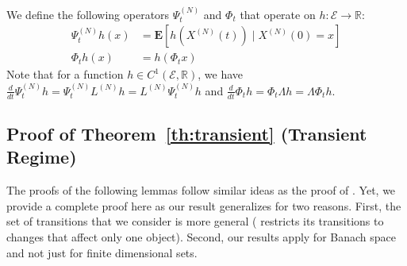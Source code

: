 \documentclass[sigconf]{acmart}
\newcommand\XN{X^{(N)}}
\newcommand\LN{L^{(N)}}
\newcommand\PsiN{\Psi^{(N)}}
\newcommand\E{\mathcal{E}}
\newcommand\R{\mathbb{R}}
\newcommand\esp[1]{\mathbf{E}\left[#1\right]}
\newcommand\dt{\frac{d}{dt}}
\begin{document}
We define the following operators $\PsiN_t$ and $\Phi_t$ that operate
on $h:\E\to\R$:
\begin{align}
  \PsiN_t h (x) &= \esp{ h(\XN(t)) \mid \XN(0) = x} \label{eq:operatorN}\\
  \Phi_t h (x) &= h( \Phi_tx ) \label{eq:operatorInf}
\end{align}
Note that for a function $h\in C^1(\E,\R)$, we have
$\dt \PsiN_th = \PsiN_t\LN h= \LN\PsiN_t h$ and
$\dt \Phi_th = \Phi_t\Lambda h= \Lambda\Phi_t h$.




\subsection{Proof of Theorem~\ref{th:transient} (Transient Regime)}
\label{sec:proof_t}

The proofs of the following lemmas follow similar ideas as the proof
of \cite[Theorem~1]{kolokoltsov2011mean}. Yet, we provide a complete
proof here as our result generalizes
\cite[Theorem~1]{kolokoltsov2011mean} for two reasons.  First, the set
of transitions that we consider is more general
(\cite{kolokoltsov2011mean} restricts its transitions to changes that
affect only one object). Second, our results apply for Banach space
and not just for finite dimensional sets.
\end{document}
